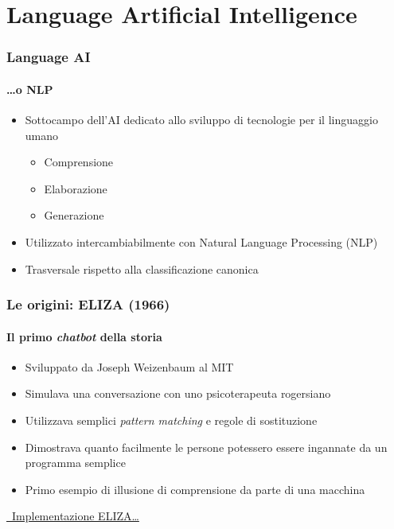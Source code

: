 \section{Language Artificial Intelligence} %
\label{sec:language_ai}
%
\begin{frame}[t,fragile] \frametitle{Language AI}
    \framesubtitle{\ldots o NLP}
	{\small
	    \begin{minipage}[t]{\textwidth}
	    	\begin{itemize}[leftmargin=10pt,align=right]
				\onslide<1->\item[\alert{\faArrowCircleRight}] Sottocampo dell'AI dedicato allo sviluppo di tecnologie per il linguaggio umano
				\begin{itemize}[leftmargin=10pt,align=right]
					\item[\alert{\faArrowCircleRight}] Comprensione
					\item[\alert{\faArrowCircleRight}] Elaborazione
					\item[\alert{\faArrowCircleRight}] Generazione
				\end{itemize}
				\item[\alert{\faArrowCircleRight}] Utilizzato intercambiabilmente con \alert{Natural Language Processing} (NLP)
				\onslide<3->\item[\alert{\faExclamationTriangle}] \alert{Trasversale} rispetto alla classificazione canonica
			\end{itemize}
	    \end{minipage}
	}
\end{frame}
%
\begin{frame}[t,fragile] \frametitle{Le origini: ELIZA (1966)}
    \framesubtitle{Il primo \textit{chatbot} della storia}
	{\small
	    \begin{minipage}[t]{\textwidth}
	    	\begin{itemize}[leftmargin=10pt,align=right]
				\onslide<1->\item[\alert{\faArrowCircleRight}] Sviluppato da \alert{Joseph Weizenbaum} al MIT
				\onslide<2->\item[\alert{\faArrowCircleRight}] Simulava una conversazione con uno \alert{psicoterapeuta} rogersiano
				\onslide<3->\item[\alert{\faArrowCircleRight}] Utilizzava semplici \alert{\textit{pattern matching}} e regole di sostituzione
				\onslide<4->\item[\alert{\faArrowCircleRight}] Dimostrava quanto facilmente le persone potessero essere \alert{ingannate} da un programma semplice
				\onslide<5->\item[\alert{\faArrowCircleRight}] Primo esempio di \alert{illusione di comprensione} da parte di una macchina
			\end{itemize}
        \end{minipage}
		\vfill
		\begin{center}
			\href{https://www.masswerk.at/elizabot/eliza.html}{\faExternalLinkSquare\ Implementazione ELIZA\ldots}
		\end{center}
	}
\end{frame}
